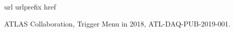 \begin{thebibliography}{10}
\makeatletter
\renewcommand\@biblabel[1]{}
\makeatother
\expandafter\ifx\csname url\endcsname\relax
  \def\url#1{\texttt{#1}}\fi
\expandafter\ifx\csname urlprefix\endcsname\relax\def\urlprefix{URL }\fi
\expandafter\ifx\csname href\endcsname\relax
  \def\href#1#2{#2} \def\path#1{#1}\fi

{ATLAS Collaboration}, {Trigger Menu
  in 2018}, \href{https://atlas.web.cern.ch/Atlas/GROUPS/PHYSICS/PUBNOTES/ATL-DAQ-PUB-2019-001/}{ATL-DAQ-PUB-2019-001}.  
\end{thebibliography}

